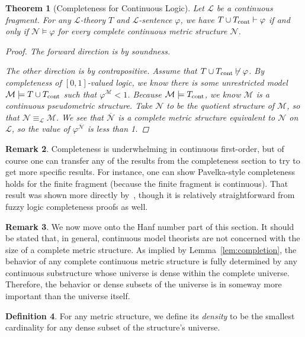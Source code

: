\documentclass{amsart}
\newtheorem{theorem}{Theorem}[section]
\theoremstyle{definition}
\newtheorem{remark}[theorem]{Remark}
\newtheorem{definition}[theorem]{Definition}
\numberwithin{equation}{theorem}
\renewcommand{\phi}{\varphi}
\newcommand{\proves}{\vdash}
\newcommand{\frag}{\mathcal{L}}
\begin{document}
\begin{theorem}[Completeness for Continuous Logic]
  Let $\frag$ be a continuous fragment.
  For any $\frag$-theory $T$ and $\frag$-sentence $\phi$, we have $T\cup\Tcont\proves\phi$ if and only if $\mathcal N\models\phi$ for every complete continuous metric structure $\mathcal N$.
  \begin{proof}
    The forward direction is by soundness.
    
    The other direction is by contrapositive.
    Assume that $T\cup\Tcont\not\proves\phi$.
    By completeness of $[0,1]$-valued logic, we know there is some unrestricted model $\mathcal M\models T\cup{T_\text{cont}}$ such that $\phi^\mathcal M<1$.
    Because $\mathcal M\models{T_\text{cont}}$, we know $\mathcal M$ is a continuous pseudometric structure.
    Take $\mathcal N$ to be the quotient structure of $\mathcal M$, so that $\mathcal N\equiv_\frag\mathcal M$.
    We see that $\overline{\mathcal N}$ is a complete metric structure equivalent to $\mathcal N$ on $\frag$, so the value of $\phi^{\overline{\mathcal N}}$ is less than 1.
  \end{proof}
\end{theorem}
\begin{remark}
  Completeness is underwhelming in continuous first-order, but of course one can transfer any of the results from the completeness section to try to get more specific results.
  For instance, one can show Pavelka-style completeness holds for the finite fragment (because the finite fragment is continuous).
  That result was shown more directly by~\cite{yaacov2010proof}, though it is relatively straightforward from fuzzy logic completeness proofs as well.
\end{remark}
\begin{remark}
  We now move onto the Hanf number part of this section.
  It should be stated that, in general, continuous model theorists are not concerned with the size of a complete metric structure.
  As implied by Lemma~\ref{lem:completion}, the behavior of any complete continuous metric structure is fully determined by any continuous substructure whose universe is dense within the complete universe.
  Therefore, the behavior or dense subsets of the universe is in someway more important than the universe itself.
\end{remark}
\begin{definition}
  For any metric structure, we define its \emph{density} to be the smallest cardinality for any dense subset of the structure's universe.
\end{definition}
\end{document}
